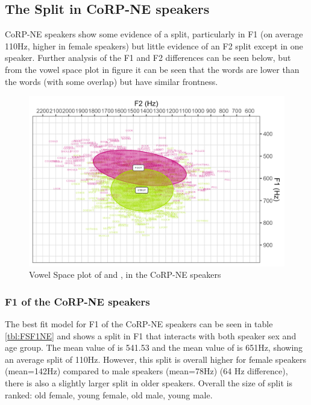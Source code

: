 \documentclass[../../../00.FullDoc/tex/ThesisSkeleton-draft2]{subfiles}
\begin{document}
\subsection{The  Split in CoRP-NE speakers} \label{subsec:FSNE}
CoRP-NE speakers show some evidence of a \FS{} split, particularly in F1 (on average 110Hz, higher in female speakers) but little evidence of an F2 split except in one speaker. Further analysis of the F1 and F2 differences can be seen below, but from the vowel space plot in figure it can be seen that the \strutt{} words are lower than the \foot{} words (with some overlap) but have similar frontness.

\begin{figure}[h]
	\includegraphics[width=\textwidth]{../figures/FS-NE-vplot.png}
	\caption{Vowel Space plot of \foot{} and \strutt{}, in the CoRP-NE speakers} \label{fig:FSvplotNE}
\end{figure}


\subsubsection{F1 of the CoRP-NE speakers} \label{subsubsec:NEF1}

The best fit model for F1 of the CoRP-NE speakers can be seen in table \ref{tbl:FSF1NE} and shows a \FS{} split in F1 that interacts with both speaker sex and age group. The mean value of \foot{} is 541.53 and the mean value of \strutt{} is 651Hz, showing an average split of 110Hz. However, this split is overall higher for female speakers (mean=142Hz) compared to male speakers (mean=78Hz) (64 Hz difference), there is also a slightly larger split in older speakers. Overall the size of split is ranked: old female, young female, old male, young male.
\end{document}
